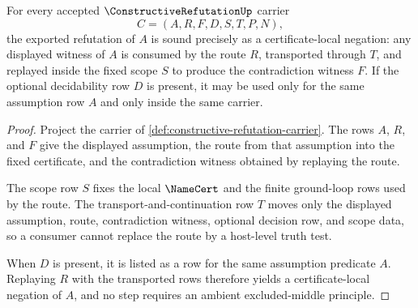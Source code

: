 \begin{theorem}
\label{thm:constructive-refutation-permitted-soundness}
For every accepted $\ConstructiveRefutationUp$ carrier
$$
C=(A,R,F,D,S,T,P,N),
$$
the exported refutation of $A$ is sound precisely as a certificate-local negation: any displayed witness of $A$ is consumed by the route $R$, transported through $T$, and replayed inside the fixed scope $S$ to produce the contradiction witness $F$. If the optional decidability row $D$ is present, it may be used only for the same assumption row $A$ and only inside the same carrier.
\end{theorem}
\begin{proof}
Project the carrier of \autoref{def:constructive-refutation-carrier}. The rows $A$, $R$, and $F$ give the displayed assumption, the route from that assumption into the fixed certificate, and the contradiction witness obtained by replaying the route.

The scope row $S$ fixes the local $\NameCert$ and the finite ground-loop rows used by the route. The transport-and-continuation row $T$ moves only the displayed assumption, route, contradiction witness, optional decision row, and scope data, so a consumer cannot replace the route by a host-level truth test.

When $D$ is present, it is listed as a row for the same assumption predicate $A$. Replaying $R$ with the transported rows therefore yields a certificate-local negation of $A$, and no step requires an ambient excluded-middle principle.
\end{proof}

